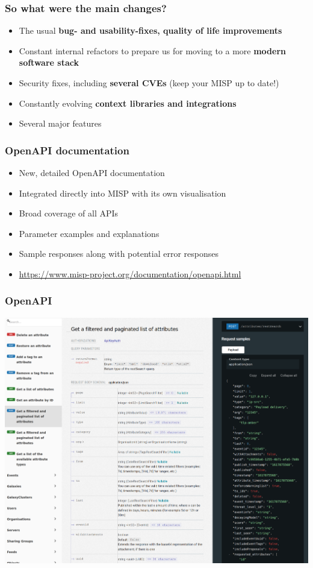 \begin{frame}
  \frametitle{So what were the main changes?}
  \begin{itemize}
     \item The usual {\bf bug- and usability-fixes, quality of life improvements}
     \item Constant internal refactors to prepare us for moving to a more {\bf modern software stack}
     \item Security fixes, including {\bf several CVEs} (keep your MISP up to date!)
     \item Constantly evolving {\bf context libraries and integrations}
     \item Several major features
  \end{itemize}
\end{frame}

\begin{frame}
\frametitle{OpenAPI documentation}
\begin{itemize}
	\item New, detailed OpenAPI documentation
        \item Integrated directly into MISP with its own visualisation
        \item Broad coverage of all APIs
        \item Parameter examples and explanations
        \item Sample responses along with potential error responses
        \item \url{https://www.misp-project.org/documentation/openapi.html}
\end{itemize}
\end{frame}

\begin{frame}
\frametitle{OpenAPI}
\includegraphics[scale=0.18]{images/openapi.png}
\end{frame}

